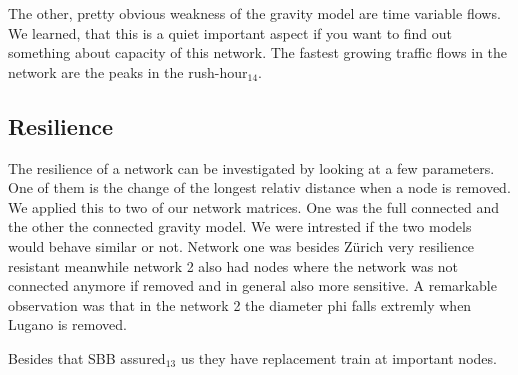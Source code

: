\documentclass[11pt]{article}
\begin{document}
The other, pretty obvious weakness of the gravity model are time variable flows. We learned, that this is a quiet important aspect if you want to find out something about capacity of this network. The fastest growing traffic flows in the network are the peaks in the rush-hour$_{14}$.






\subsection{Resilience}

The resilience of a network can be investigated by looking at a few parameters. One of them is the change of the longest relativ distance when a node is removed. We applied this to two of our network matrices. One was the full connected and the other the connected gravity model. We were intrested if the two models would behave similar or not. Network one was besides Z\"urich very resilience resistant meanwhile network 2 also had nodes where the network was not connected anymore if removed and in general also more sensitive. A remarkable observation was that in the network 2 the diameter phi falls extremly when Lugano is removed.


 
Besides that SBB assured$_{13}$ us they have replacement train at important nodes.
\end{document}
